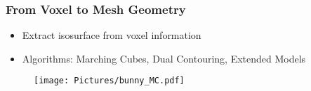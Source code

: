 \begin{frame}

	\frametitle{From Voxel to Mesh Geometry}
	\begin{minipage}{0.85\textwidth}
		\begin{itemize}
		\item Extract isosurface from voxel information
		\end{itemize}

		\begin{itemize}
		\item Algorithms: Marching Cubes, Dual Contouring, Extended Models
		\end{itemize}

		\begin{figure}
		\texttt{[image: Pictures/bunny\_MC.pdf]}

		\end{figure}

	\end{minipage}
	\begin{minipage}{0.14\textwidth}
		\begin{figure}
					\\
					\\
					\\
					\\
					\\
					\\
		\end{figure}
	\end{minipage}



\end{frame}

